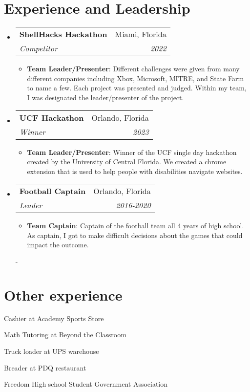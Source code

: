 \documentclass[a4paper,20pt]{article}
\makeatletter
\newcommand{\resumeItem}[2]{
  \item\normalsize{
    \textbf{#1}{: #2 \vspace{1pt}}
  }
}
\newcommand{\resumeSubheading}[4]{
  \vspace{-1pt}\item
    \begin{tabular*}{.97\textwidth}{l@{\extracolsep{\fill}}r}
      \large\textbf{#1} & #2 \\
      \textit{#3} & \textit{#4} \\
    \end{tabular*}\vspace{-5pt}
}
\newcommand{\resumeSubHeadingListStart}{\begin{itemize}[leftmargin=*]}
\newcommand{\resumeSubHeadingListEnd}{\end{itemize}}
\newcommand{\resumeItemListStart}{\begin{itemize}}
\newcommand{\resumeItemListEnd}{\end{itemize}\vspace{-5pt}}
\makeatother
\begin{document}
    \section{Experience and Leadership}
        \resumeSubHeadingListStart
            \resumeSubheading{ShellHacks Hackathon}{Miami, Florida}{Competitor}{2022}
                \resumeItemListStart
                    \resumeItem{Team Leader/Presenter}{Different challenges were given from many different companies including Xbox, Microsoft, MITRE, and State Farm to name a few. Each project was presented and judged. Within my team, I was designated the leader/presenter of the project.}
                \resumeItemListEnd
                 \resumeSubheading{UCF Hackathon}{Orlando, Florida}{Winner}{2023}
                \resumeItemListStart
                    \resumeItem{Team Leader/Presenter}{Winner of the UCF single day hackathon created by the University of Central Florida. We created a chrome extension that is used to help people with disabilities navigate websites. }
                \resumeItemListEnd
                \resumeSubheading{Football Captain}{Orlando, Florida}{Leader}{2016-2020}
                \resumeItemListStart
                    \resumeItem{Team Captain}{Captain of the football team all 4 years of high school. As captain, I got to make difficult decisions about the games that could impact the outcome.}
                \resumeItemListEnd
                    
                    -
          \resumeSubHeadingListEnd
    
    
    
    \section{Other experience}
        \begin{description}[font=$\bullet$]
            \item {Cashier at Academy Sports Store}
            \item {Math Tutoring at Beyond the Classroom}
            \item {Truck loader at UPS warehouse}
            \item {Breader at PDQ restaurant}
            \item {Freedom High school Student Government Association}
            
        \end{description}
        
        
\end{document}
